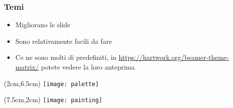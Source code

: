 \begin{frame}
 
 \frametitle{Temi}
 
 \begin{itemize}
  \item Migliorano le slide
  \item Sono relativamente facili da fare
  \item Ce ne sono molti di predefiniti, in 
\url{https://hartwork.org/beamer-theme-matrix/} potete vedere la loro 
anteprima
 \end{itemize}
 
 \begin{textblock*}{5cm}(2cm,6.5cm)
    \texttt{[image: palette]}
 \end{textblock*}

 
 \begin{textblock*}{5cm}(7.5cm,2cm)
    \texttt{[image: painting]}
 \end{textblock*}

\end{frame}
